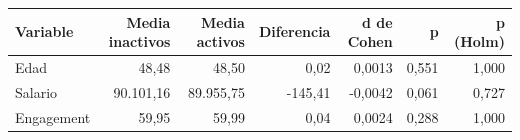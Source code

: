 \begin{tabular}{lrrrrrr}
\toprule
Variable & Media inactivos & Media activos & Diferencia & d de Cohen & p & p (Holm) \\
\midrule
Edad & 48,48 & 48,50 & 0,02 & 0,0013 & 0,551 & 1,000 \\
Salario & 90.101,16 & 89.955,75 & -145,41 & -0,0042 & 0,061 & 0,727 \\
Engagement & 59,95 & 59,99 & 0,04 & 0,0024 & 0,288 & 1,000 \\
\bottomrule
\end{tabular}
